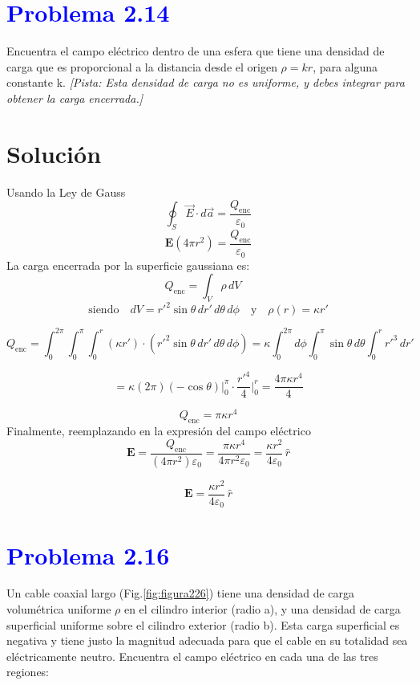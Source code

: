 \documentclass[12pt]{article}
\begin{document}
\section*{\textcolor{blue}{Problema 2.14}}

Encuentra el campo eléctrico dentro de una esfera que tiene una densidad de carga que es proporcional a la distancia desde el origen \(\rho = kr\), para alguna constante k.
\textit{[Pista: Esta densidad de carga no es uniforme, y debes integrar para obtener la carga encerrada.]}


\section*{Solución}

Usando la Ley de Gauss \[\oint_S \vec{E} \cdot d\vec{a} = \frac{Q_{\text{enc}}}{\varepsilon_0}
\]
\[
\textbf{E}(4\pi r^2) = \frac{Q_{\text{enc}}}{\varepsilon_0}
\]
La carga encerrada por la superficie gaussiana es:
\[
Q_{\text{enc}} = \int_V \rho \, dV \quad 
\]
\[
\text{siendo} \quad dV = r'^2 \sin\theta \, dr' \, d\theta \, d\phi
\quad \text{y} \quad \rho(r) = \kappa r'
\]

\[
Q_{\text{enc}} = \int_0^{2\pi} \int_0^{\pi} \int_0^r (\kappa r') \cdot (r'^2 \sin\theta \, dr' \, d\theta \, d\phi )
= \kappa \int_0^{2\pi} d\phi \int_0^{\pi} \sin\theta \, d\theta \int_0^r r'^3 \, dr'
\]

\[
= \kappa (2\pi)(-\cos\theta)\Big|_0^{\pi} \cdot \frac{r'^4}{4} \Big|_0^{r}
= \frac{4\pi \kappa r^4}{4}
\]

\[
Q_{\text{enc}} = \pi \kappa r^4
\]
Finalmente, reemplazando en la expresión del campo eléctrico
\[
\textbf{E}  
= \frac{Q_{\text{enc}}}{(4\pi r^2)\varepsilon_0} 
= \frac{\pi \kappa r^4}{4\pi r^2 \varepsilon_0}
= \frac{\kappa r^2}{4\varepsilon_0} \, \hat{r}
\]

\[
\boxed{\textbf{E} = \frac{\kappa r^2}{4\varepsilon_0} \, \hat{r}}
\]


\section*{\textcolor{blue}{Problema 2.16}}


Un cable coaxial largo (Fig.\ref{fig:figura226}) tiene una densidad de carga volumétrica uniforme \(\rho \) en el cilindro interior (radio a), y una densidad de carga superficial uniforme sobre el cilindro exterior (radio b). Esta carga superficial es negativa y tiene justo la magnitud adecuada para que el cable en su totalidad sea eléctricamente neutro.
Encuentra el campo eléctrico en cada una de las tres regiones:
\end{document}
